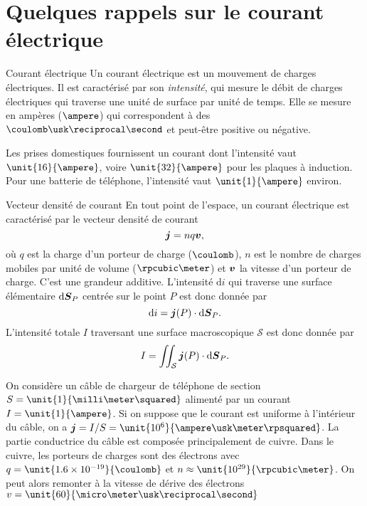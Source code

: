\section{Quelques rappels sur le courant électrique}

\begin{defn}{Courant électrique}
Un courant électrique est un mouvement de charges électriques. Il est caractérisé 
par son \emph{intensité}, qui mesure le débit de charges électriques qui traverse
une unité de surface par unité de temps. Elle se mesure en ampères ($\ampere$)
qui correspondent à des $\coulomb \usk \reciprocal \second$ et peut-être 
positive ou négative.
\end{defn}

\begin{exemple}
	Les prises domestiques fournissent un courant dont l'intensité vaut
	$\unit{16}{\ampere}$, voire $\unit{32}{\ampere}$ pour les plaques à induction. 
	Pour une batterie de téléphone, l'intensité vaut
	$\unit{1}{\ampere}$ environ.
\end{exemple}

\begin{defn}{Vecteur densité de courant}
	En tout point de l'espace, un courant électrique est caractérisé par le vecteur 
densité de courant  
	\begin{equation}
		\vecj = n q \vecv,
		\label{eq:jnqv}
	\end{equation}
	où $q$ est la charge d'un porteur de charge ($\coulomb$), $n$ est le
	nombre de charges mobiles par unité de volume ($\rpcubic \meter$) et
	$\vecv$ la vitesse d'un porteur de charge. C'est une grandeur additive.
	L'intensité $\mathrm{d}i$
	qui traverse une surface élémentaire $\ds_P$ centrée sur le point 
	$P$ est donc donnée par 
	\begin{equation}
		\mathrm{d}i = \vecj(P) \cdot \ds_P.
	\end{equation}
	L'intensité totale $I$ traversant une surface macroscopique $\mathcal{S}$
	est donc donnée par 
	\begin{equation}
		I = \iint_\mathcal{S} \vecj(P) \cdot \ds_P.
	\end{equation}
\end{defn}

\begin{exemple}
	On considère un câble de chargeur de téléphone de section $S = \unit{1}
	{\milli \meter \squared}$ alimenté par un courant $I = \unit{1}{\ampere}$.
	Si on suppose que le courant est uniforme à l'intérieur du câble, on a
	$\vecj = I/S = \unit{10^6}{\ampere \usk \meter \rpsquared}$. La partie 
	conductrice du câble est composée principalement de cuivre. Dans le cuivre, 
	les porteurs de charges sont des électrons avec $q = \unit{1.6 \times 10^{-19}
	}{\coulomb}$ et $n \approx \unit{10^{29}}{\rpcubic \meter}$. On peut alors remonter
	à la vitesse de dérive des électrons $v = \unit{60}
	{\micro \meter \usk \reciprocal \second}$
\end{exemple}

